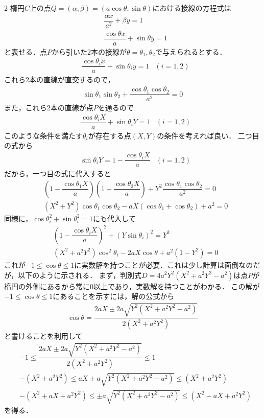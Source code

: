 \documentclass[../../main.tex]{subfiles}
\begin{document}
\begin{multicols}{2}
  楕円$C$上の点$Q=(\alpha,\beta)=(a\cos\theta,\sin\theta)$における接線の方程式は
  \begin{align}
    & \dfrac{\alpha x}{a^2} + \beta y = 1        \\
    & \dfrac{\cos\theta x}{a} + \sin\theta y = 1
  \end{align}
  と表せる．点$P$から引いた2本の接線が$\theta=\theta_1, \theta_2$で与えられるとする．
  \begin{align}
    & \dfrac{\cos\theta_{i} x}{a} + \sin\theta_{i} y = 1 & (i = 1,2)
  \end{align}
  これら2本の直線が直交するので，
  \begin{align}
    \sin\theta_1\sin\theta_2 + \dfrac{\cos\theta_1\cos\theta_2}{a^2} = 0
  \end{align}
  また，これら2本の直線が点$P$を通るので
  \begin{align}
    & \dfrac{\cos\theta_{i} X}{a} + \sin\theta_{i} Y = 1 & (i = 1,2)
  \end{align}
  このような条件を満たす$\theta_i$が存在する点$(X,Y)$の条件を考えれば良い．
  二つ目の式から
  \begin{align}
    & \sin\theta_{i} Y = 1 - \dfrac{\cos\theta_{i} X}{a} & (i = 1,2) \label{eq:10}
  \end{align}
  だから，一つ目の式に代入すると
  \begin{align}
    & \left(1 - \dfrac{\cos\theta_{1} X}{a} \right)\left(1 - \dfrac{\cos\theta_{2} X}{a} \right) +Y^2\dfrac{\cos\theta_1\cos\theta_2}{a^2} = 0 \\
    & \left(X^2+Y^2\right)\cos\theta_1\cos\theta_2 -aX(\cos\theta_1+\cos\theta_2) + a^2 = 0
  \end{align}
  同様に，$\cos\theta_{i}^2+\sin\theta_{i}^2=1$にも代入して
  \begin{align}
    & \left(1 - \dfrac{\cos\theta_{i} X}{a} \right)^2+\left(Y\sin\theta_{i}\right)^2 = Y^2   \\
    & \left(X^2+a^2Y^2\right)\cos^2\theta_{i} - 2aX\cos\theta + a^2\left(1-Y^2\right) = 0
  \end{align}
  これが$-1\le\cos\theta\le 1$に実数解を持つことが必要．これは少し計算は面倒なのだが，以下のように示される．
  まず，判別式$D=4a^2Y^2(X^2+a^2Y^2-a^2)$は点$P$が楕円の外側にあるから常に$0$以上であり，実数解を持つことがわかる．
  この解が$-1\le\cos\theta\le 1$にあることを示すには，解の公式から
  \begin{align}
    \cos\theta = \dfrac{2aX\pm 2a\sqrt{Y^2(X^2+a^2Y^2-a^2)}}{2(X^2+a^2Y^2)}
  \end{align}
  と書けることを利用して
  \begin{align}
    & -1 \le  \dfrac{2aX\pm 2a\sqrt{Y^2(X^2+a^2Y^2-a^2)}}{2(X^2+a^2Y^2)} \le 1    \\
    & -(X^2+a^2Y^2) \le aX\pm a\sqrt{Y^2(X^2+a^2Y^2-a^2)} \le (X^2+a^2Y^2)       \\
    & -(X^2+aX+a^2Y^2) \le \pm a\sqrt{Y^2(X^2+a^2Y^2-a^2)} \le (X^2-aX + a^2Y^2)
  \end{align}
  を得る．


\end{multicols}
\end{document}
